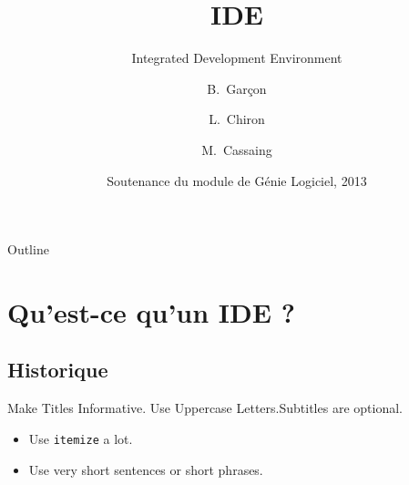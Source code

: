 \documentclass{beamer}
\title{IDE}
\subtitle
{Integrated Development Environment}
\author[Garçon, Chiron, Cassaing] %
{B.~Garçon\inst{1} \and L.~Chiron\inst{2} \and M.~Cassaing\inst{3}}
\institute[ISIMA] %
{
  \inst{1}%
  Étudiant de Prep'ISIMA
  \and
  \inst{2}%
  Étudiant de Prep'ISIMA
  \and
  \inst{3}%
  Étudiante de Prep'ISIMA}
\date[SGL 2013] %
{Soutenance du module de Génie Logiciel, 2013}
\begin{document}
\begin{frame}
  \titlepage
\end{frame}

\begin{frame}{Outline}
  \tableofcontents
\end{frame}





\section{Qu'est-ce qu'un IDE ?}

\subsection{Historique}

\begin{frame}{Make Titles Informative. Use Uppercase Letters.}{Subtitles are optional.}

  \begin{itemize}
  \item
    Use \texttt{itemize} a lot.
  \item
    Use very short sentences or short phrases.
  \end{itemize}
\end{frame}
\end{document}
